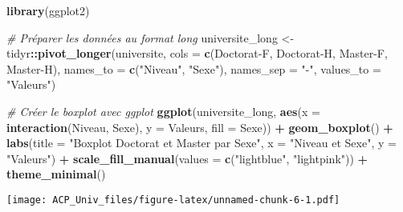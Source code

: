 \documentclass[
]{article}
\newenvironment{Shaded}{\begin{snugshade}}{\end{snugshade}}
\newcommand{\AttributeTok}[1]{\textcolor[rgb]{0.13,0.29,0.53}{#1}}
\newcommand{\CommentTok}[1]{\textcolor[rgb]{0.56,0.35,0.01}{\textit{#1}}}
\newcommand{\FunctionTok}[1]{\textcolor[rgb]{0.13,0.29,0.53}{\textbf{#1}}}
\newcommand{\NormalTok}[1]{#1}
\newcommand{\OtherTok}[1]{\textcolor[rgb]{0.56,0.35,0.01}{#1}}
\newcommand{\SpecialCharTok}[1]{\textcolor[rgb]{0.81,0.36,0.00}{\textbf{#1}}}
\newcommand{\StringTok}[1]{\textcolor[rgb]{0.31,0.60,0.02}{#1}}
\begin{document}
\begin{Shaded}
\begin{Highlighting}[]
\FunctionTok{library}\NormalTok{(ggplot2)}

\CommentTok{\# Préparer les données au format long}
\NormalTok{universite\_long }\OtherTok{\textless{}{-}}\NormalTok{ tidyr}\SpecialCharTok{::}\FunctionTok{pivot\_longer}\NormalTok{(universite, }\AttributeTok{cols =} \FunctionTok{c}\NormalTok{(}\StringTok{\textasciigrave{}}\AttributeTok{Doctorat{-}F}\StringTok{\textasciigrave{}}\NormalTok{, }\StringTok{\textasciigrave{}}\AttributeTok{Doctorat{-}H}\StringTok{\textasciigrave{}}\NormalTok{, }\StringTok{\textasciigrave{}}\AttributeTok{Master{-}F}\StringTok{\textasciigrave{}}\NormalTok{, }\StringTok{\textasciigrave{}}\AttributeTok{Master{-}H}\StringTok{\textasciigrave{}}\NormalTok{), }
                                       \AttributeTok{names\_to =} \FunctionTok{c}\NormalTok{(}\StringTok{"Niveau"}\NormalTok{, }\StringTok{"Sexe"}\NormalTok{), }\AttributeTok{names\_sep =} \StringTok{"{-}"}\NormalTok{, }\AttributeTok{values\_to =} \StringTok{"Valeurs"}\NormalTok{)}

\CommentTok{\# Créer le boxplot avec ggplot}
\FunctionTok{ggplot}\NormalTok{(universite\_long, }\FunctionTok{aes}\NormalTok{(}\AttributeTok{x =} \FunctionTok{interaction}\NormalTok{(Niveau, Sexe), }\AttributeTok{y =}\NormalTok{ Valeurs, }\AttributeTok{fill =}\NormalTok{ Sexe)) }\SpecialCharTok{+}
  \FunctionTok{geom\_boxplot}\NormalTok{() }\SpecialCharTok{+}
  \FunctionTok{labs}\NormalTok{(}\AttributeTok{title =} \StringTok{"Boxplot Doctorat et Master par Sexe"}\NormalTok{, }\AttributeTok{x =} \StringTok{"Niveau et Sexe"}\NormalTok{, }\AttributeTok{y =} \StringTok{"Valeurs"}\NormalTok{) }\SpecialCharTok{+}
  \FunctionTok{scale\_fill\_manual}\NormalTok{(}\AttributeTok{values =} \FunctionTok{c}\NormalTok{(}\StringTok{"lightblue"}\NormalTok{, }\StringTok{"lightpink"}\NormalTok{)) }\SpecialCharTok{+}
  \FunctionTok{theme\_minimal}\NormalTok{()}
\end{Highlighting}
\end{Shaded}

\texttt{[image: ACP\_Univ\_files/figure-latex/unnamed-chunk-6-1.pdf]}
\end{document}

